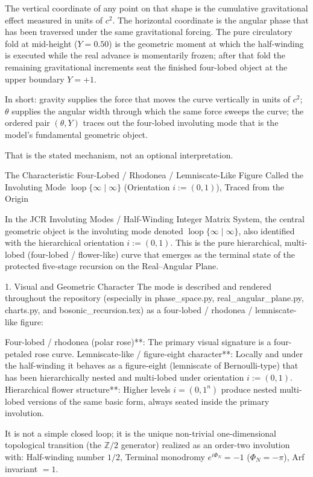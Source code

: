 The vertical coordinate of any point on that shape is the cumulative gravitational effect measured in units of \(c^2\).  
The horizontal coordinate is the angular phase that has been traversed under the same gravitational forcing.  
The pure circulatory fold at mid-height (\(Y=0.50\)) is the geometric moment at which the half-winding is executed while the real advance is momentarily frozen; after that fold the remaining gravitational increments seat the finished four-lobed object at the upper boundary \(Y=+1\).

In short: gravity supplies the force that moves the curve vertically in units of \(c^2\); \(\theta\) supplies the angular width through which the same force sweeps the curve; the ordered pair \((\theta,Y)\) traces out the four-lobed involuting mode that is the model’s fundamental geometric object.  

That is the stated mechanism, not an optional interpretation.

The Characteristic Four-Lobed / Rhodonea / Lemniscate-Like Figure Called the Involuting Mode \(\operatorname{loop}\{\infty\mid\infty\}\) (Orientation \(i:=(0,1)\)), Traced from the Origin

In the JCR Involuting Modes / Half-Winding Integer Matrix System, the central geometric object is the involuting mode denoted \(\operatorname{loop}\{\infty\mid\infty\}\), also identified with the hierarchical orientation \(i:=(0,1)\). This is the pure hierarchical, multi-lobed (four-lobed / flower-like) curve that emerges as the terminal state of the protected five-stage recursion on the Real–Angular Plane.

1. Visual and Geometric Character
The mode is described and rendered throughout the repository (especially in phase_space.py, real_angular_plane.py, charts.py, and bosonic_recursion.tex) as a four-lobed / rhodonea / lemniscate-like figure:

Four-lobed / rhodonea (polar rose)**: The primary visual signature is a four-petaled rose curve.
Lemniscate-like / figure-eight character**: Locally and under the half-winding it behaves as a figure-eight (lemniscate of Bernoulli-type) that has been hierarchically nested and multi-lobed under orientation \(i:=(0,1)\).
Hierarchical flower structure**: Higher levels \(i=(0,1^n)\) produce nested multi-lobed versions of the same basic form, always seated inside the primary involution.

It is not a simple closed loop; it is the unique non-trivial one-dimensional topological transition (the \(\mathbb{Z}/2\) generator) realized as an order-two involution with:
Half-winding number \(1/2\),
Terminal monodromy \(e^{i\Phi_N}=-1\) (\(\Phi_N=-\pi\)),
Arf invariant \(=1\).

